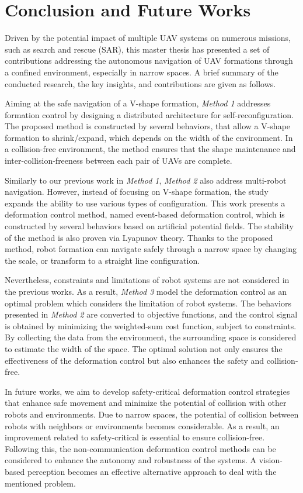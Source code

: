 \chapter{Conclusion and Future Works}\label{conclusion}

Driven by the potential impact of multiple UAV systems on numerous missions, such as search and rescue (SAR), this master thesis has presented a set of contributions addressing the autonomous navigation of UAV formations through a confined environment, especially in narrow spaces. A brief summary of the conducted research, the key insights, and contributions are given as follows.

Aiming at the safe navigation of a V-shape formation, \textit{Method 1} addresses formation control by designing a distributed architecture for self-reconfiguration. The proposed method is constructed by several behaviors, that allow a V-shape formation to shrink/expand, which depends on the width of the environment. In a collision-free environment, the method ensures that the shape maintenance and inter-collision-freeness between each pair of UAVs are complete. 

Similarly to our previous work in \textit{Method 1}, \textit{Method 2} also address multi-robot navigation. However, instead of focusing on V-shape formation, the study expands the ability to use various types of configuration. This work presents a deformation control method, named event-based deformation control, which is constructed by several behaviors based on artificial potential fields. The stability of the method is also proven via Lyapunov theory. Thanks to the proposed method, robot formation can navigate safely through a narrow space by changing the scale, or transform to a straight line configuration.

Nevertheless, constraints and limitations of robot systems are not considered in the previous works. As a result, \textit{Method 3} model the deformation control as an optimal problem which considers the limitation of robot systems. The behaviors presented in \textit{Method 2} are converted to objective functions, and the control signal is obtained by minimizing the weighted-sum cost function, subject to constraints. By collecting the data from the environment, the surrounding space is considered to estimate the width of the space. The optimal solution not only ensures the effectiveness of the deformation control but also enhances the safety and collision-free.

In future works, we aim to develop safety-critical deformation control strategies that enhance safe movement and minimize the potential of collision with other robots and environments. Due to narrow spaces, the potential of collision between robots with neighbors or environments becomes considerable. As a result, an improvement related to safety-critical is essential to ensure collision-free. Following this, the non-communication deformation control methods can be considered to enhance the autonomy and robustness of the systems. A vision-based perception becomes an effective alternative approach to deal with the mentioned problem.